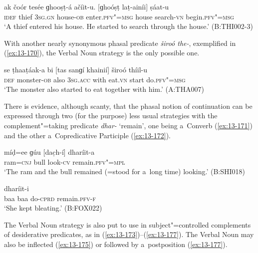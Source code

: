 \begin{exe}
\ex
\label{ex:13-169}
\gll ak čoór tesée ɡhooṣṭ-á ačíit-u. [ɡhoóṣṭ  laṭ-ainíi] ṣáat-u \\
\textsc{idef} thief \textsc{3sg.gn} house-\textsc{ob} enter.\textsc{pfv"=msg} house search-\textsc{vn} begin.\textsc{pfv"=msg} \\
\glt `A thief entered his house. He started to search through the house.' (B:THI002-3) 
\end{exe}

With another nearly synonymous phasal predicate \textit{široó the-}, exemplified in (\ref{ex:13-170}), the Verbal Noun strategy is the only possible one.

\begin{exe}
\ex
\label{ex:13-170}
\gll se ṭhaaṭáak-a bi [tas sanɡí khainií]  široó thíil-u \\
\textsc{def} monster-\textsc{ob} also \textsc{3sg.acc} with eat.\textsc{vn} start do.\textsc{pfv"=msg} \\
\glt `The monster also started to eat together with him.' (A:THA007) 
\end{exe}

There is evidence, although scanty, that the phasal notion of continuation can be expressed through two (for the purpose) less usual strategies with the complement"=taking predicate \textit{dhar-} `remain', one being a~Converb (\ref{ex:13-171}) and the other a~Copredicative Participle (\ref{ex:13-172}).

\begin{exe}
\ex
\label{ex:13-171}
\gll míḍ=ee ɡúu [dac̣h-í] dharíit-a \\
ram=\textsc{cnj} bull look-\textsc{cv} remain.\textsc{pfv"=mpl} \\
\glt `The ram and the bull remained (=stood for a~long time) looking.' (B:SHI018)

\ex
\label{ex:13-172}
 dharíit-i  \\
baa baa do-\textsc{cprd} remain.\textsc{pfv-f} \\
\glt `She kept bleating.' (B:FOX022) 
\end{exe}

 The Verbal Noun strategy is also put to use in
subject"=controlled complements of desiderative predicates, as in
(\ref{ex:13-173})--(\ref{ex:13-177}). The Verbal Noun may also be inflected
(\ref{ex:13-175}) or followed by
a~postposition (\ref{ex:13-177}).

